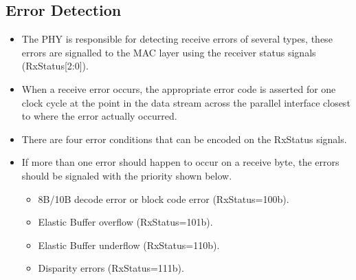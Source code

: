 \subsection{Error Detection} 
\begin{itemize}
    \item The PHY is responsible for detecting receive errors of several types, these errors are signalled to the MAC layer using the receiver status signals (RxStatus[2:0]).

    \item When a receive error occurs, the appropriate error code is asserted for one clock cycle at the point in the data stream across the parallel interface closest to where the error actually occurred.

    \item There are four error conditions that can be encoded on the RxStatus signals.

    \item If more than one error should happen to occur on a receive byte, the errors should be signaled with the priority shown below.
\begin{itemize}
    \item 8B/10B decode error or block code error (RxStatus=100b).

    \item Elastic Buffer overflow (RxStatus=101b).

    \item Elastic Buffer underflow (RxStatus=110b).

    \item Disparity errors (RxStatus=111b).

\end{itemize}
\end{itemize}
